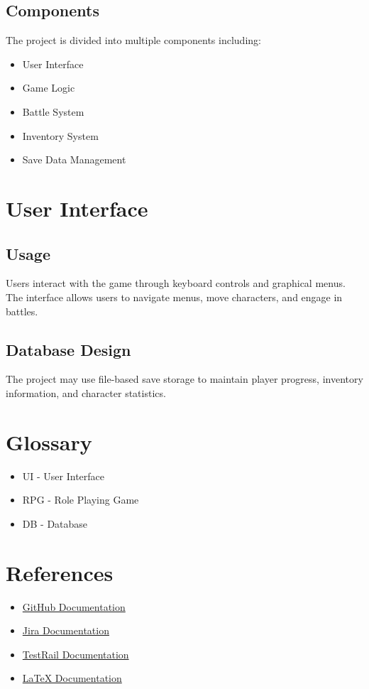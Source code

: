 \documentclass{article}
\begin{document}
\subsection{Components}
The project is divided into multiple components including:
\begin{itemize}
    \item User Interface
    \item Game Logic
    \item Battle System
    \item Inventory System
    \item Save Data Management
\end{itemize}

\section{User Interface}

\subsection{Usage}
Users interact with the game through keyboard controls and graphical menus. The interface allows users to navigate menus, move characters, and engage in battles.

\subsection{Database Design}
The project may use file-based save storage to maintain player progress, inventory information, and character statistics.

\section{Glossary}

\begin{itemize}
    \item UI - User Interface
    \item RPG - Role Playing Game
    \item DB - Database
\end{itemize}


\section{References}

\begin{itemize}
    \item \href{https://docs.github.com/}{GitHub Documentation}
    \item \href{https://support.atlassian.com/jira-software-cloud/}{Jira Documentation}
    \item \href{https://support.testrail.com/}{TestRail Documentation}
    \item \href{https://www.latex-project.org/help/documentation/}{LaTeX Documentation}
\end{itemize}
\end{document}
